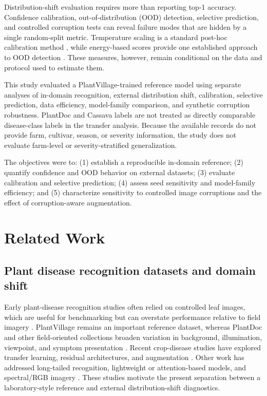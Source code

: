 \documentclass[12pt]{article}
\begin{document}
Distribution-shift evaluation requires more than reporting top-1 accuracy. Confidence calibration, out-of-distribution (OOD) detection, selective prediction, and controlled corruption tests can reveal failure modes that are hidden by a single random-split metric. Temperature scaling is a standard post-hoc calibration method \citep{guo2017}, while energy-based scores provide one established approach to OOD detection \citep{liu2020}. These measures, however, remain conditional on the data and protocol used to estimate them.

This study evaluated a PlantVillage-trained reference model using separate analyses of in-domain recognition, external distribution shift, calibration, selective prediction, data efficiency, model-family comparison, and synthetic corruption robustness. PlantDoc and Cassava labels are not treated as directly comparable disease-class labels in the transfer analysis. Because the available records do not provide farm, cultivar, season, or severity information, the study does not evaluate farm-level or severity-stratified generalization.

The objectives were to: (1) establish a reproducible in-domain reference; (2) quantify confidence and OOD behavior on external datasets; (3) evaluate calibration and selective prediction; (4) assess seed sensitivity and model-family efficiency; and (5) characterize sensitivity to controlled image corruptions and the effect of corruption-aware augmentation.

\section{Related Work}
\subsection{Plant disease recognition datasets and domain shift}
Early plant-disease recognition studies often relied on controlled leaf images, which are useful for benchmarking but can overstate performance relative to field imagery \citep{hughes2015,singh2020}. PlantVillage remains an important reference dataset, whereas PlantDoc and other field-oriented collections broaden variation in background, illumination, viewpoint, and symptom presentation \citep{singh2020,crossref46,crossref32}. Recent crop-disease studies have explored transfer learning, residual architectures, and augmentation \citep{crossref6,crossref10,crossref25}. Other work has addressed long-tailed recognition, lightweight or attention-based models, and spectral/RGB imagery \citep{crossref13,crossref28,crossref43}. These studies motivate the present separation between a laboratory-style reference and external distribution-shift diagnostics.
\end{document}
